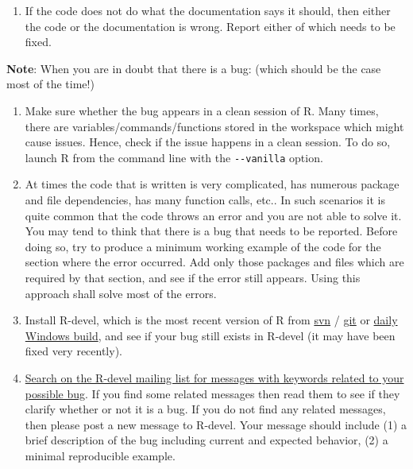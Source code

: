 \documentclass[
]{book}
\providecommand{\tightlist}{%
  \setlength{\itemsep}{0pt}\setlength{\parskip}{0pt}}
\begin{document}
\begin{enumerate}
\def\labelenumi{\arabic{enumi}.}
\setcounter{enumi}{1}
\tightlist
\item
  If the code does not do what the documentation says it should, then either the code or the documentation is wrong. Report either of which needs to be fixed.
\end{enumerate}

\textbf{Note}:
When you are in doubt that there is a bug: (which should be the case most of the time!)

\begin{enumerate}
\def\labelenumi{\arabic{enumi}.}
\item
  Make sure whether the bug appears in a clean session of R. Many times, there are variables/commands/functions stored in the workspace which might cause issues. Hence, check if the issue happens in a clean session. To do so, launch R from the command line with the \texttt{-\/-vanilla} option.
\item
  At times the code that is written is very complicated, has numerous package and file dependencies, has many function calls, etc.. In such scenarios it is quite common that the code throws an error and you are not able to solve it. You may tend to think that there is a bug that needs to be reported. Before doing so, try to produce a minimum working example of the code for the section where the error occurred. Add only those packages and files which are required by that section, and see if the error still appears. Using this approach shall solve most of the errors.
\item
  Install R-devel, which is the most recent version of R from \href{https://svn.r-project.org/R/trunk/}{svn} / \href{https://github.com/r-devel/r-svn}{git} or \href{https://cran.r-project.org/bin/windows/base/rdevel.html}{daily Windows build}, and see if your bug still exists in R-devel (it may have been fixed very recently).
\item
  \href{https://r.789695.n4.nabble.com/template/NamlServlet.jtp?macro=search_page&node=909078&query=isna&days=0}{Search on the R-devel mailing list for messages with keywords related to your possible bug}. If you find some related messages then read them to see if they clarify whether or not it is a bug. If you do not find any related messages, then please post a new message to R-devel. Your message should include (1) a brief description of the bug including current and expected behavior, (2) a minimal reproducible example.
\end{enumerate}
\end{document}
